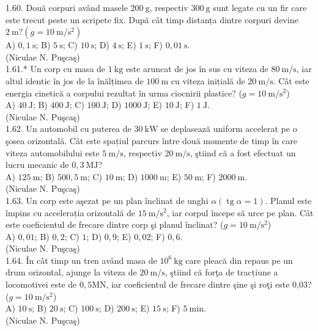 1.60. Două corpuri având masele $200 \mathrm{~g}$, respectiv $300 \mathrm{~g}$ sunt legate cu un fir care este trecut peste un scripete fix. După cât timp distanța dintre corpuri devine $2 \mathrm{~m}? (g=10 \mathrm{~m} / \mathrm{s}^{2})$\\ A) $0,1 \mathrm{~s}$; B) $5 \mathrm{~s}$; C) $10 \mathrm{~s}$; D) $4 \mathrm{~s}$; E) $1 \mathrm{~s}$; F) $0,01 \mathrm{~s}$.\\ (Niculae N. Puşcaş)\\

1.61.* Un corp cu masa de $1 \mathrm{~kg}$ este aruncat de jos în sus cu viteza de $80 \mathrm{~m} / \mathrm{s}$, iar altul identic în jos de la înălțimea de $100 \mathrm{~m}$ cu viteza inițială de $20 \mathrm{~m} / \mathrm{s}$. Cât este energia cinetică a corpului rezultat în urma ciocnirii plastice? ($g=10 \mathrm{~m} / \mathrm{s}^{2}$)\\ A) $40 \mathrm{~J}$; B) $400 \mathrm{~J}$; C) $100 \mathrm{~J}$; D) $1000 \mathrm{~J}$; E) $10 \mathrm{~J}$; F) $1 \mathrm{~J}$.\\ (Niculae N. Puşcaş)\\

1.62. Un automobil cu puterea de $30 \mathrm{~kW}$ se deplasează uniform accelerat pe o şosea orizontală. Cât este spațiul parcurs între două momente de timp în care viteza automobilului este $5 \mathrm{~m} / \mathrm{s}$, respectiv $20 \mathrm{~m} / \mathrm{s}$, ştiind că a fost efectuat un lucru mecanic de $0,3 \mathrm{~MJ}$?\\ A) $125 \mathrm{~m}$; B) $500,5 \mathrm{~m}$; C) $10 \mathrm{~m}$; D) $1000 \mathrm{~m}$; E) $50 \mathrm{~m}$; F) $2000 \mathrm{~m}$.\\ (Niculae N. Puşcaş)\\

1.63. Un corp este aşezat pe un plan înclinat de unghi $\alpha (\operatorname{tg} \alpha=1)$. Planul este împins cu accelerația orizontală de $15 \mathrm{~m} / \mathrm{s}^{2}$, iar corpul începe sã urce pe plan. Cât este coeficientul de frecare dintre corp şi planul înclinat? ($g=10 \mathrm{~m} / \mathrm{s}^{2}$)\\ A) $0,01$; B) $0,2$; C) $1$; D) $0,9$; E) $0,02$; F) $0,6$.\\ (Niculae N. Puşcaş)\\

1.64. În cât timp un tren având masa de $10^{6} \mathrm{~kg}$ care pleacă din repaus pe un drum orizontal, ajunge la viteza de $20 \mathrm{~m} / \mathrm{s}$, ştiind că forţa de tracțiune a locomotivei este de $0,5 \mathrm{MN}$, iar coeficientul de frecare dintre şine şi roţi este 0,03? ($g=10 \mathrm{~m} / \mathrm{s}^{2}$)\\ A) $10 \mathrm{~s}$; B) $20 \mathrm{~s}$; C) $100 \mathrm{~s}$; D) $200 \mathrm{~s}$; E) $15 \mathrm{~s}$; F) $5 \mathrm{~min}$.\\ (Niculae N. Puşcaş)\\

